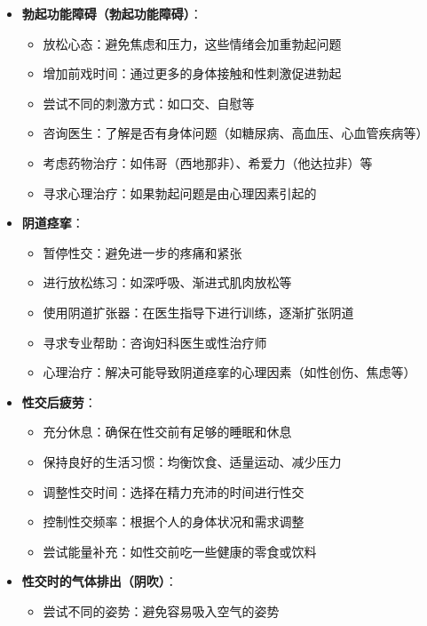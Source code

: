 \documentclass[12pt,UTF8]{ctexbook}
\begin{document}
\begin{itemize}
\begin{itemize}
		\item 使用局部麻醉剂：在医生指导下使用含有麻醉成分的延时喷剂或乳膏
		\item 进行凯格尔运动：锻炼盆底肌肉，提高射精控制能力
		\item 咨询医生或性治疗师，了解是否有身体或心理问题
	\end{itemize}
	\item \textbf{勃起功能障碍（勃起功能障碍）}：
	\begin{itemize}
		\item 放松心态：避免焦虑和压力，这些情绪会加重勃起问题
		\item 增加前戏时间：通过更多的身体接触和性刺激促进勃起
		\item 尝试不同的刺激方式：如口交、自慰等
		\item 咨询医生：了解是否有身体问题（如糖尿病、高血压、心血管疾病等）
		\item 考虑药物治疗：如伟哥（西地那非）、希爱力（他达拉非）等
		\item 寻求心理治疗：如果勃起问题是由心理因素引起的
	\end{itemize}
	\item \textbf{阴道痉挛}：
	\begin{itemize}
		\item 暂停性交：避免进一步的疼痛和紧张
		\item 进行放松练习：如深呼吸、渐进式肌肉放松等
		\item 使用阴道扩张器：在医生指导下进行训练，逐渐扩张阴道
		\item 寻求专业帮助：咨询妇科医生或性治疗师
		\item 心理治疗：解决可能导致阴道痉挛的心理因素（如性创伤、焦虑等）
	\end{itemize}
	\item \textbf{性交后疲劳}：
	\begin{itemize}
		\item 充分休息：确保在性交前有足够的睡眠和休息
		\item 保持良好的生活习惯：均衡饮食、适量运动、减少压力
		\item 调整性交时间：选择在精力充沛的时间进行性交
		\item 控制性交频率：根据个人的身体状况和需求调整
		\item 尝试能量补充：如性交前吃一些健康的零食或饮料
	\end{itemize}
	\item \textbf{性交时的气体排出（阴吹）}：
	\begin{itemize}
		\item 尝试不同的姿势：避免容易吸入空气的姿势

\end{itemize}
\end{itemize}
\end{document}
